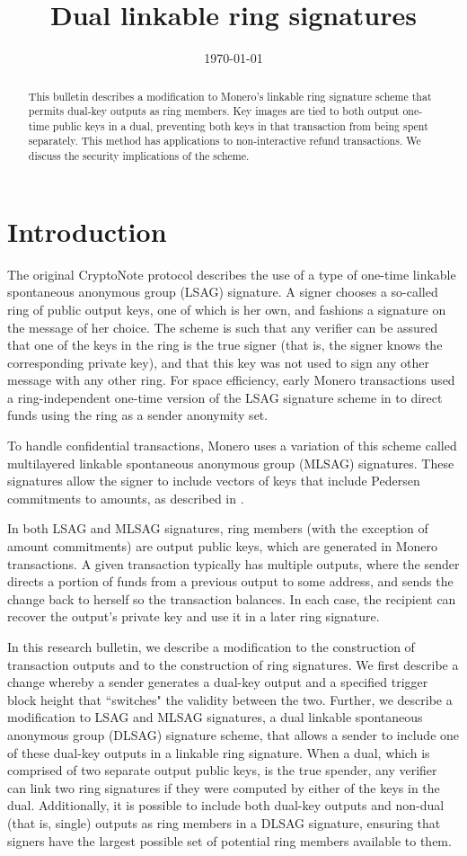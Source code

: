 \documentclass{mrl}
\title{Dual linkable ring signatures}
\date{\today}
\begin{document}
\begin{abstract}
This bulletin describes a modification to Monero's linkable ring signature scheme that permits dual-key outputs as ring members. Key images are tied to both output one-time public keys in a dual, preventing both keys in that transaction from being spent separately. This method has applications to non-interactive refund transactions. We discuss the security implications of the scheme.
\end{abstract}

\section{Introduction}
The original CryptoNote protocol describes the use of a type of one-time linkable spontaneous anonymous group (LSAG) signature. A signer chooses a so-called ring of public output keys, one of which is her own, and fashions a signature on the message of her choice. The scheme is such that any verifier can be assured that one of the keys in the ring is the true signer (that is, the signer knows the corresponding private key), and that this key was not used to sign any other message with any other ring. For space efficiency, early Monero transactions used a ring-independent one-time version of the LSAG signature scheme in \cite{liu} to direct funds using the ring as a sender anonymity set.

To handle confidential transactions, Monero uses a variation of this scheme called multilayered linkable spontaneous anonymous group (MLSAG) signatures. These signatures allow the signer to include vectors of keys that include Pedersen commitments to amounts, as described in \cite{shen}.

In both LSAG and MLSAG signatures, ring members (with the exception of amount commitments) are output public keys, which are generated in Monero transactions. A given transaction typically has multiple outputs, where the sender directs a portion of funds from a previous output to some address, and sends the change back to herself so the transaction balances. In each case, the recipient can recover the output's private key and use it in a later ring signature.

In this research bulletin, we describe a modification to the construction of transaction outputs and to the construction of ring signatures. We first describe a change whereby a sender generates a dual-key output and a specified trigger block height that ``switches" the validity between the two. Further, we describe a modification to LSAG and MLSAG signatures, a dual linkable spontaneous anonymous group (DLSAG) signature scheme, that allows a sender to include one of these dual-key outputs in a linkable ring signature. When a dual, which is comprised of two separate output public keys, is the true spender, any verifier can link two ring signatures if they were computed by either of the keys in the dual. Additionally, it is possible to include both dual-key outputs and non-dual (that is, single) outputs as ring members in a DLSAG signature, ensuring that signers have the largest possible set of potential ring members available to them.
\end{document}
